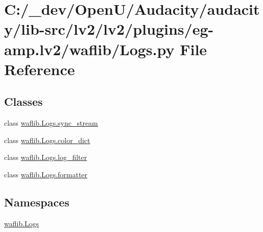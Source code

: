 \hypertarget{lv2_2plugins_2eg-amp_8lv2_2waflib_2_logs_8py}{}\section{C\+:/\+\_\+dev/\+Open\+U/\+Audacity/audacity/lib-\/src/lv2/lv2/plugins/eg-\/amp.lv2/waflib/\+Logs.py File Reference}
\label{lv2_2plugins_2eg-amp_8lv2_2waflib_2_logs_8py}
\subsection*{Classes}
\begin{DoxyCompactItemize}
\item 
class \hyperlink{classwaflib_1_1_logs_1_1sync__stream}{waflib.\+Logs.\+sync\+\_\+stream}
\item 
class \hyperlink{classwaflib_1_1_logs_1_1color__dict}{waflib.\+Logs.\+color\+\_\+dict}
\item 
class \hyperlink{classwaflib_1_1_logs_1_1log__filter}{waflib.\+Logs.\+log\+\_\+filter}
\item 
class \hyperlink{classwaflib_1_1_logs_1_1formatter}{waflib.\+Logs.\+formatter}
\end{DoxyCompactItemize}
\subsection*{Namespaces}
\begin{DoxyCompactItemize}
\item 
 \hyperlink{namespacewaflib_1_1_logs}{waflib.\+Logs}
\end{DoxyCompactItemize}
